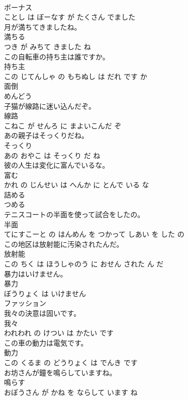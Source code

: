 \documentclass[8pt]{extreport}
\begin{document}
\begin{CJK}{UTF8}{min}
\\	ボーナス 
\\	ことし は ぼーなす が たくさん でました			
\\	月が満ちてきましたね。	
\\	満ちる 
\\	つき が みちて きました ね			
\\	この自転車の持ち主は誰ですか。	
\\	持ち主 
\\	この じてんしゃ の もちぬし は だれ です か			
\\	面倒	
\\	めんどう			
\\	子猫が線路に迷い込んだぞ。	
\\	線路 
\\	こねこ が せんろ に まよいこんだ ぞ			
\\	あの親子はそっくりだね。	
\\	そっくり 
\\	あの おやこ は そっくり だ ね			
\\	彼の人生は変化に富んでいるな。	
\\	富む 
\\	かれ の じんせい は へんか に とんで いる な			
\\	詰める	
\\	つめる			
\\	テニスコートの半面を使って試合をしたの。	
\\	半面 
\\	てにすこーと の はんめん を つかって しあい を した の			
\\	この地区は放射能に汚染されたんだ。	
\\	放射能 
\\	この ちく は ほうしゃのう に おせん された ん だ			
\\	暴力はいけません。	
\\	暴力 
\\	ぼうりょく は いけません			
\\	ファッション	
\\	我々の決意は固いです。	
\\	我々 
\\	われわれ の けつい は かたい です			
\\	この車の動力は電気です。	
\\	動力 
\\	この くるま の どうりょく は でんき です			
\\	お坊さんが鐘を鳴らしていますね。	
\\	鳴らす 
\\	おぼうさん が かね を ならして います ね			

\end{CJK}
\end{document}
